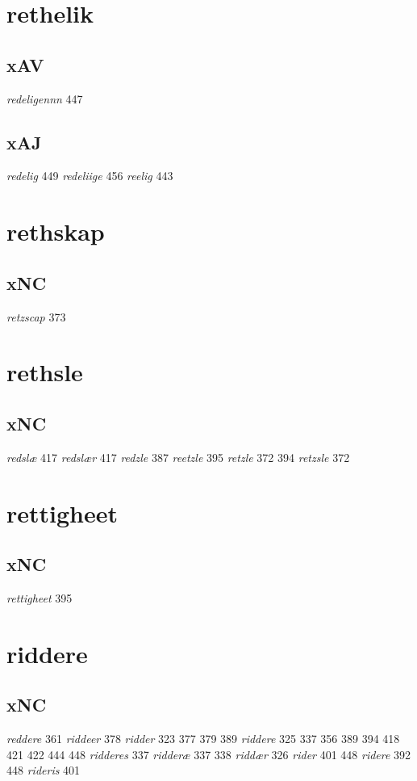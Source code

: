 \documentclass[a4paper,twocolumn]{article}
\begin{document}
\section{rethelik}
\label{sec:org25c262e}
\subsection{xAV}
\label{sec:orgbb4f990}
\emph{redeligennn} 447 
\subsection{xAJ}
\label{sec:org3f6ff00}
\emph{redelig} 449 \emph{redeliige} 456 \emph{reelig} 443 
\section{rethskap}
\label{sec:org59be5c4}
\subsection{xNC}
\label{sec:org8180e63}
\emph{retzscap} 373 
\section{rethsle}
\label{sec:org1e52b36}
\subsection{xNC}
\label{sec:orge866015}
\emph{redslæ} 417 \emph{redslær} 417 \emph{redzle} 387 \emph{reetzle} 395 \emph{retzle} 372 394 \emph{retzsle} 372 
\section{rettigheet}
\label{sec:orgb9451a0}
\subsection{xNC}
\label{sec:org5362bf8}
\emph{rettigheet} 395 
\section{riddere}
\label{sec:org70aeb04}
\subsection{xNC}
\label{sec:orgae7c9b0}
\emph{reddere} 361 \emph{riddeer} 378 \emph{ridder} 323 377 379 389 \emph{riddere} 325 337 356 389 394 418 421 422 444 448 \emph{ridderes} 337 \emph{ridderæ} 337 338 \emph{riddær} 326 \emph{rider} 401 448 \emph{ridere} 392 448 \emph{rideris} 401 
\end{document}
